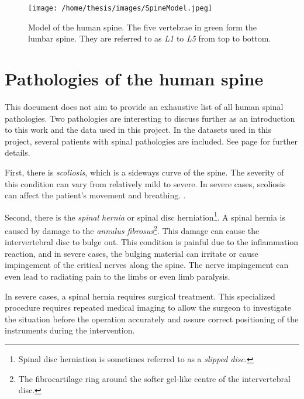 \begin{SCfigure}[][h!]
    \centering
    \texttt{[image: /home/thesis/images/SpineModel.jpeg]}
    \caption{\label{fig:spineimage}Model of the human spine. The five vertebrae in green form the lumbar spine. They are referred to as \textit{L1} to \textit{L5} from top to bottom. }
\end{SCfigure}

\section{Pathologies of the human spine}

This document does not aim to provide an exhaustive list of all human spinal pathologies. 
Two pathologies are interesting to discuss further as an introduction to this work and the data used in this project.
In the datasets used in this project, several patients with spinal pathologies are included. See page \pageref{sec:datasets} for further details.


First, there is \textit{scoliosis}, which is a sideways curve of the spine.
The severity of this condition can vary from relatively mild to severe. 
In severe cases, scoliosis can affect the patient's movement and breathing.
.


Second, there is the \textit{spinal hernia} or spinal disc herniation\footnote{Spinal disc herniation is sometimes referred to as a \textit{slipped disc}.}. 
A spinal hernia is caused by damage to the \textit{annulus fibrosus}\footnote{The fibrocartilage ring around the softer gel-like centre of the intervertebral disc.}. 
This damage can cause the intervertebral disc to bulge out. 
This condition is painful due to the inflammation reaction, and in severe cases, the bulging material can irritate or cause impingement of the critical nerves along the spine.
The nerve impingement can even lead to radiating pain to the limbs or even limb paralysis.

In severe cases, a spinal hernia requires surgical treatment.
This specialized procedure requires repeated medical imaging to allow the surgeon to investigate the situation before the operation accurately and assure correct positioning of the instruments during the intervention.




